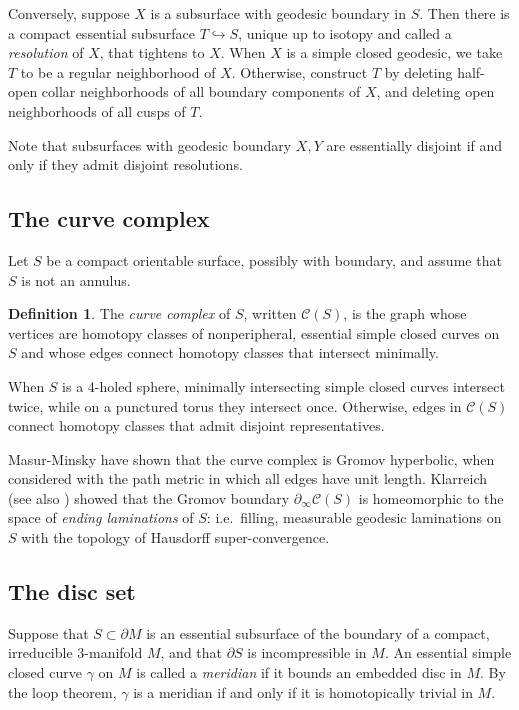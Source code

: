 \documentclass[12pt]{amsart}
\theoremstyle{definition}
\newtheorem{definition}[theorem]{Definition}
\theoremstyle{remark}
\begin{document}
\medskip

Conversely, suppose $X$ is a subsurface with geodesic boundary in $S$. Then there is a compact essential subsurface $T \hookrightarrow S$, unique up to isotopy and called a \emph{resolution} of $X$, that tightens to $X$. When $X$ is a simple closed geodesic, we take $T$ to be a regular neighborhood of $X$. Otherwise, construct $T$ by deleting half-open collar neighborhoods of all boundary components of $X$, and deleting open neighborhoods of all cusps of $T$. 

Note that subsurfaces with geodesic boundary $X,Y$ are essentially disjoint if and only if they admit disjoint resolutions.


\subsection {The curve complex}
\label {sec:cc}

Let $S $ be a compact orientable surface, possibly with boundary, and assume that $S$ is not an annulus.

\begin {definition}The \emph {curve complex} of $S $, written $\mathcal C (S )$, is the graph whose vertices are homotopy classes of nonperipheral, essential simple closed curves on $S $ and whose edges connect homotopy classes that intersect minimally.  \end {definition}

When $S$ is a 4-holed sphere, minimally intersecting simple closed curves intersect twice, while on a punctured torus they intersect once.  Otherwise, edges in $\mathcal C (S )$ connect homotopy classes that admit disjoint representatives.  

Masur-Minsky \cite {Masurgeometry1} have shown that the curve complex is Gromov hyperbolic, when considered with the path metric in which all edges have unit length.  Klarreich \cite {Klarreichboundary} (see also \cite {Hamenstadttrain}) showed that the Gromov boundary $\partial_\infty \mathcal C (S)$ is homeomorphic to the space of \emph {ending laminations} of $S$: i.e.\ filling, measurable geodesic laminations on $S$ with the topology of Hausdorff super-convergence.



\subsection{The disc set}


Suppose that $S\subset \partial M$ is an essential subsurface of the boundary of a compact, irreducible $3$-manifold $M $, and that $\partial S$ is incompressible in $M$.  An essential simple closed curve $\gamma $ on $M$ is called a \emph {meridian} if it bounds an embedded disc in $M $.  By the loop theorem, $\gamma $ is a meridian if and only if it is homotopically trivial in $M $.
\end{document}
